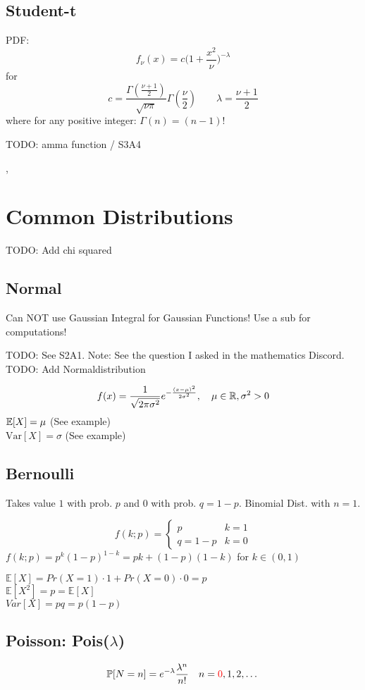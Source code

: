 \subsection*{Student-t}
PDF:
\[
    f_\nu(x) = c \big(1+\frac{x^2}{\nu}\bigg)^{-\lambda}
\]
for
\[
    c = \frac{\Gamma(\frac{\nu+1}{2})}{\sqrt{\nu\pi}} \Gamma(\frac{\nu}{2})
    \qquad
    \lambda = \frac{\nu+1}{2}
\]
where for any positive integer: $\Gamma(n) = (n-1)!$



TODO: amma function / S3A4

\sep



\section*{Common Distributions}
TODO: Add chi squared

\subsection*{Normal}
\textbullet Can NOT use Gaussian Integral for Gaussian Functions!
\textbullet Use a sub for computations!

TODO: See S2A1. Note: See the question I asked in the mathematics Discord.
TODO: Add Normaldistribution

\[
    f(x) = \frac{1}{\sqrt{2\pi\sigma^2}}e^{-\frac{(x-\mu)^2}{2\sigma^2}}
    , \quad \mu\in\mathbb{R}, \sigma^2 > 0
\]
$\mathbb{E}[X] = \mu$ (See example) \\
$\text{Var}[X] = \sigma$ (See example)

\subsection*{Bernoulli}
\warning Takes value $1$ with prob. $p$ and $0$ with prob. $q = 1 - p$.
\warning Binomial Dist. with $n=1$.

\[
  f(k;p) = \begin{cases}
    p & k = 1 \\
    q = 1-p & k = 0
  \end{cases}
\]
$f(k;p) = p^k(1-p)^{1-k} = pk + (1-p)(1-k)$ for $k \in (0, 1)$ 

$\mathbb{E}[X] = Pr(X = 1) \cdot 1 + Pr(X = 0)\cdot 0 = p$ \\
$\mathbb{E}[X^2] = p = \mathbb{E}[X]$ \\
$Var[X] = pq = p(1-p)$


\subsection*{Poisson: Pois($\lambda$)}
\[
  \mathbb{P}[N = n] = e^{-\lambda}\frac{\lambda^n}{n!}
  \quad n = \textcolor{red}{0}, 1, 2, \dots
\]

